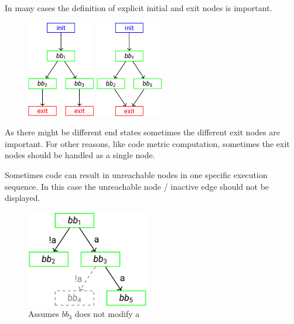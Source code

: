 \documentclass[
../../Software_Engineering_Summary.tex,
]
{subfiles}
\begin{document}
In many cases the definition of explicit initial and exit nodes is important.

\begin{figure}[htp]
    \begin{minipage}
        [t]{0.47\textwidth}
        \centering
        \includegraphics[height=120pt]{Pics/ExampleCFGInitialExit.png}
    \end{minipage}
    \hfill
    \begin{minipage}
        [t]{0.47\textwidth}
        \centering
        \includegraphics[height=120pt]{Pics/ExampleCFGSingleExit.png}
    \end{minipage}
\end{figure}

As there might be different end states sometimes the different exit nodes are important. For other reasons, like code metric computation, sometimes the exit nodes should be handled as a single node.

Sometimes code can result in unreachable nodes in one specific execution sequence. In this case the unreachable node / inactive edge should not be displayed.

\begin{figure}
    [htp]
    \centering
    \includegraphics[height=120pt]{Pics/ExampleCFGInactiveEdges.png}
    \caption{Assumes $bb_3$ does not modify a}
\end{figure}
\end{document}
